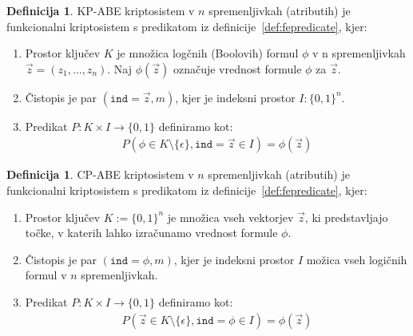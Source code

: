 \documentclass[12pt,a4paper,openany,tikz]{book}
\theoremstyle{plain}
\theoremstyle{definition}
\newtheorem{defn}[thm]{Definicija} %
\begin{document}
\begin{mdframed}[frametitle={KP-ABE kriptosistem}]
\begin{minipage}{\textwidth}
\begin{defn}
KP-ABE kriptosistem v $n$ spremenljivkah (atributih) je funkcionalni kriptosistem s predikatom iz definicije~\ref{def:fepredicate}, kjer:

\begin{enumerate}
  \item Prostor ključev $K$ je množica logčnih (Boolovih) formul $\phi$ v n spremenljivkah $\vec{z} = (z_1, \ldots, z_n)$. Naj $\phi(\vec{z})$ označuje vrednost formule $\phi$ za $\vec{z}$.
  \item Čistopis je par $(\texttt{ind} = \vec{z}, m)$, kjer je indeksni prostor $I: {\{}0,1{\}}^n$.
  \item Predikat $P: K \times I \rightarrow {\{}0, 1{\}}$ definiramo kot:
  \begin{gather*}
  P(\phi \in K \setminus {\{}\epsilon{\}}, \texttt{ind} = \vec{z} \in I) = \phi(\vec{z})
  \end{gather*}
\end{enumerate}
\label{def:kpabe}
\end{defn}
\end{minipage}
\end{mdframed}

\begin{mdframed}[frametitle={CP-ABE kriptosistem}]
\begin{minipage}{\textwidth}
\begin{defn}
CP-ABE kriptosistem v $n$ spremenljivkah (atributih) je funkcionalni kriptosistem s predikatom iz definicije~\ref{def:fepredicate}, kjer:

\begin{enumerate}
  \item Prostor ključev $K := {\{}0,1{\}}^n$ je množica vseh vektorjev $\vec{z}$, ki predstavljajo točke, v katerih lahko izračunamo vrednost formule $\phi$.
  \item Čistopis je par $(\texttt{ind} = \phi, m)$, kjer je indeksni prostor $I$ možica vseh logičnih formul v $n$ spremenljivkah.
  \item Predikat $P: K \times I \rightarrow {\{}0, 1{\}}$ definiramo kot:
  \begin{gather*}
  P(\vec{z} \in K \setminus {\{}\epsilon{\}}, \texttt{ind} = \phi \in I) = \phi(\vec{z})
  \end{gather*}
\end{enumerate}
\label{def:cpabe}
\end{defn}
\end{minipage}
\end{mdframed}
\end{document}
